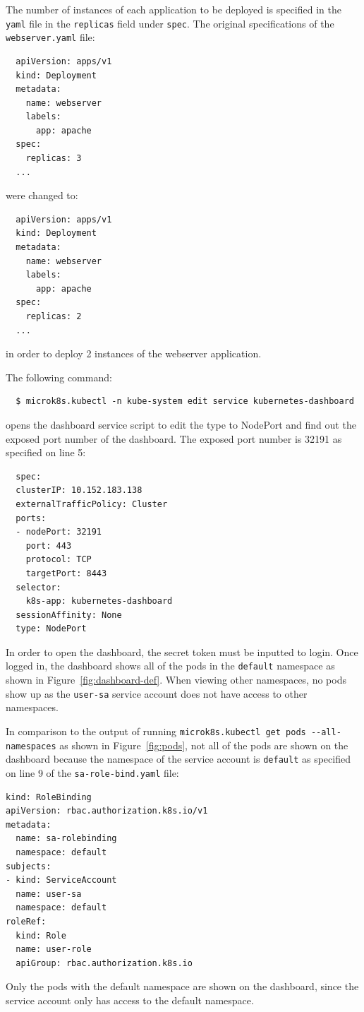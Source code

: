 \documentclass[11pt]{article}
\begin{document}
The number of instances of each application to be deployed is specified in the \verb|yaml| file in the \verb|replicas| field under \verb|spec|.
The original specifications of the \verb|webserver.yaml| file:
\begin{verbatim}
  apiVersion: apps/v1
  kind: Deployment
  metadata:
    name: webserver
    labels:
      app: apache
  spec:
    replicas: 3
  ...
\end{verbatim}
were changed to:
\begin{verbatim}
  apiVersion: apps/v1
  kind: Deployment
  metadata:
    name: webserver
    labels:
      app: apache
  spec:
    replicas: 2
  ...
\end{verbatim}
in order to deploy 2 instances of the webserver application.

\noindent The following command:
\begin{verbatim}
  $ microk8s.kubectl -n kube-system edit service kubernetes-dashboard
\end{verbatim}
opens the dashboard service script to edit the type to NodePort and find out the exposed port number of the dashboard.
The exposed port number is 32191 as specified on line 5:
\begin{verbatim}
  spec:
  clusterIP: 10.152.183.138
  externalTrafficPolicy: Cluster
  ports:
  - nodePort: 32191
    port: 443
    protocol: TCP
    targetPort: 8443
  selector:
    k8s-app: kubernetes-dashboard
  sessionAffinity: None
  type: NodePort
\end{verbatim}

In order to open the dashboard, the secret token must be inputted to login. Once logged in,
the dashboard shows all of the pods in the \verb|default| namespace as shown in Figure~\ref{fig:dashboard-def}.
When viewing other namespaces, no pods show up as the \verb|user-sa| service account does not have access to other namespaces.

In comparison to the output of running \verb|microk8s.kubectl get pods --all-namespaces| as shown in Figure~\ref{fig:pods},
not all of the pods are shown on the dashboard because the namespace of the service account is \verb|default| as specified on
line 9 of the \verb|sa-role-bind.yaml| file:
\begin{verbatim}
kind: RoleBinding
apiVersion: rbac.authorization.k8s.io/v1
metadata:
  name: sa-rolebinding
  namespace: default
subjects:
- kind: ServiceAccount
  name: user-sa
  namespace: default
roleRef:
  kind: Role
  name: user-role
  apiGroup: rbac.authorization.k8s.io
\end{verbatim}
Only the pods with the default namespace are shown on the dashboard, since the service account only has access to the default namespace.~\cite{rbac}
\end{document}
